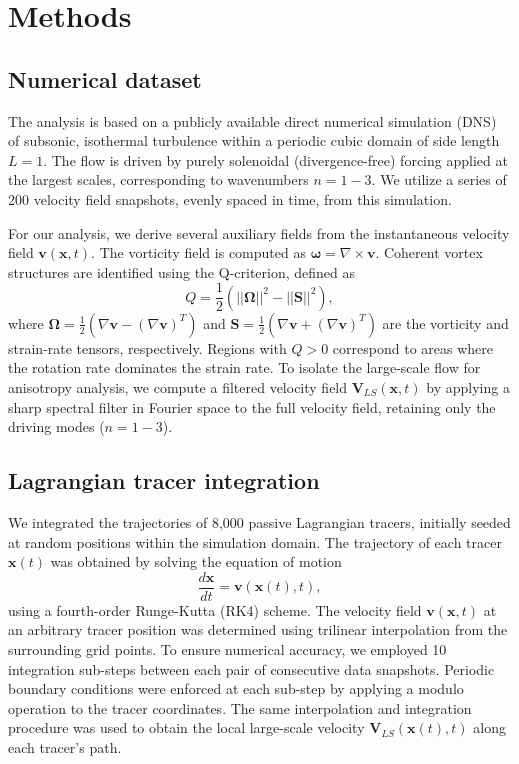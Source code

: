 \documentclass[]{article}
\begin{document}
\section{Methods}
\label{sec:methods}
\subsection{Numerical dataset}
The analysis is based on a publicly available direct numerical simulation (DNS) of subsonic, isothermal turbulence within a periodic cubic domain of side length $L=1$. The flow is driven by purely solenoidal (divergence-free) forcing applied at the largest scales, corresponding to wavenumbers $n=1-3$. We utilize a series of 200 velocity field snapshots, evenly spaced in time, from this simulation.

For our analysis, we derive several auxiliary fields from the instantaneous velocity field $\mathbf{v}(\mathbf{x}, t)$. The vorticity field is computed as $\boldsymbol{\omega} = \nabla \times \mathbf{v}$. Coherent vortex structures are identified using the Q-criterion, defined as
\begin{equation}
    Q = \frac{1}{2} \left( ||\boldsymbol{\Omega}||^2 - ||\mathbf{S}||^2 \right),
\end{equation}
where $\boldsymbol{\Omega} = \frac{1}{2}(\nabla\mathbf{v} - (\nabla\mathbf{v})^T)$ and $\mathbf{S} = \frac{1}{2}(\nabla\mathbf{v} + (\nabla\mathbf{v})^T)$ are the vorticity and strain-rate tensors, respectively. Regions with $Q > 0$ correspond to areas where the rotation rate dominates the strain rate. To isolate the large-scale flow for anisotropy analysis, we compute a filtered velocity field $\mathbf{V}_{LS}(\mathbf{x}, t)$ by applying a sharp spectral filter in Fourier space to the full velocity field, retaining only the driving modes ($n=1-3$).

\subsection{Lagrangian tracer integration}
We integrated the trajectories of 8,000 passive Lagrangian tracers, initially seeded at random positions within the simulation domain. The trajectory of each tracer $\mathbf{x}(t)$ was obtained by solving the equation of motion
\begin{equation}
    \frac{d\mathbf{x}}{dt} = \mathbf{v}(\mathbf{x}(t), t),
\end{equation}
using a fourth-order Runge-Kutta (RK4) scheme. The velocity field $\mathbf{v}(\mathbf{x}, t)$ at an arbitrary tracer position was determined using trilinear interpolation from the surrounding grid points. To ensure numerical accuracy, we employed 10 integration sub-steps between each pair of consecutive data snapshots. Periodic boundary conditions were enforced at each sub-step by applying a modulo operation to the tracer coordinates. The same interpolation and integration procedure was used to obtain the local large-scale velocity $\mathbf{V}_{LS}(\mathbf{x}(t), t)$ along each tracer's path.
\end{document}
